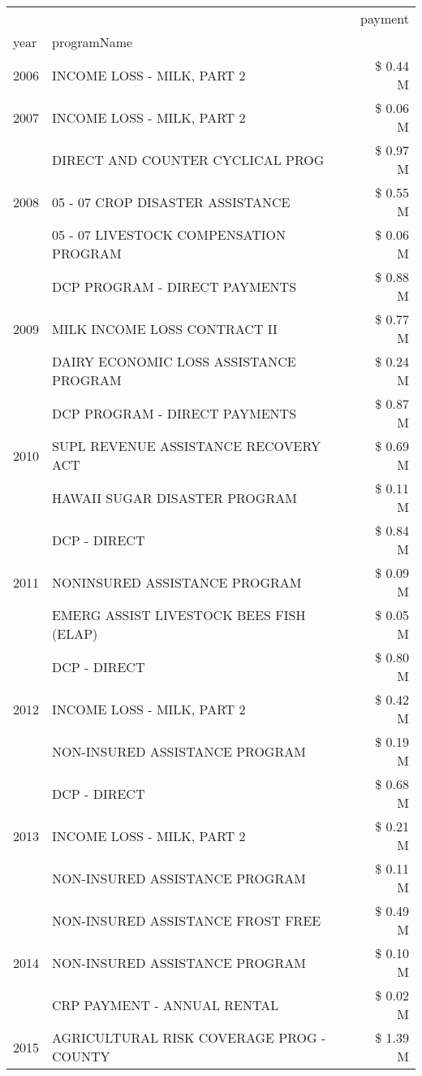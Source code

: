 \begin{tabular}{llr}
\toprule
 &  & payment \\
year & programName &  \\
\midrule
2006 & INCOME LOSS - MILK, PART 2 & \$ 0.44 M \\
\cline{1-3}
2007 & INCOME LOSS - MILK, PART 2 & \$ 0.06 M \\
\cline{1-3}
\multirow[t]{3}{*}{2008} & DIRECT AND COUNTER CYCLICAL PROG & \$ 0.97 M \\
 & 05 - 07 CROP DISASTER ASSISTANCE & \$ 0.55 M \\
 & 05 - 07 LIVESTOCK COMPENSATION PROGRAM & \$ 0.06 M \\
\cline{1-3}
\multirow[t]{3}{*}{2009} & DCP PROGRAM - DIRECT PAYMENTS & \$ 0.88 M \\
 & MILK INCOME LOSS CONTRACT II & \$ 0.77 M \\
 & DAIRY ECONOMIC LOSS ASSISTANCE PROGRAM & \$ 0.24 M \\
\cline{1-3}
\multirow[t]{3}{*}{2010} & DCP PROGRAM - DIRECT PAYMENTS & \$ 0.87 M \\
 & SUPL REVENUE ASSISTANCE RECOVERY ACT & \$ 0.69 M \\
 & HAWAII SUGAR DISASTER PROGRAM & \$ 0.11 M \\
\cline{1-3}
\multirow[t]{3}{*}{2011} & DCP - DIRECT & \$ 0.84 M \\
 & NONINSURED ASSISTANCE PROGRAM & \$ 0.09 M \\
 & EMERG ASSIST LIVESTOCK BEES FISH (ELAP) & \$ 0.05 M \\
\cline{1-3}
\multirow[t]{3}{*}{2012} & DCP - DIRECT & \$ 0.80 M \\
 & INCOME LOSS - MILK, PART 2 & \$ 0.42 M \\
 & NON-INSURED ASSISTANCE PROGRAM & \$ 0.19 M \\
\cline{1-3}
\multirow[t]{3}{*}{2013} & DCP - DIRECT & \$ 0.68 M \\
 & INCOME LOSS - MILK, PART 2 & \$ 0.21 M \\
 & NON-INSURED ASSISTANCE PROGRAM & \$ 0.11 M \\
\cline{1-3}
\multirow[t]{3}{*}{2014} & NON-INSURED ASSISTANCE FROST FREE & \$ 0.49 M \\
 & NON-INSURED ASSISTANCE PROGRAM & \$ 0.10 M \\
 & CRP PAYMENT - ANNUAL RENTAL & \$ 0.02 M \\
\cline{1-3}
\multirow[t]{3}{*}{2015} & AGRICULTURAL RISK COVERAGE PROG - COUNTY & \$ 1.39 M \\

\end{tabular}
